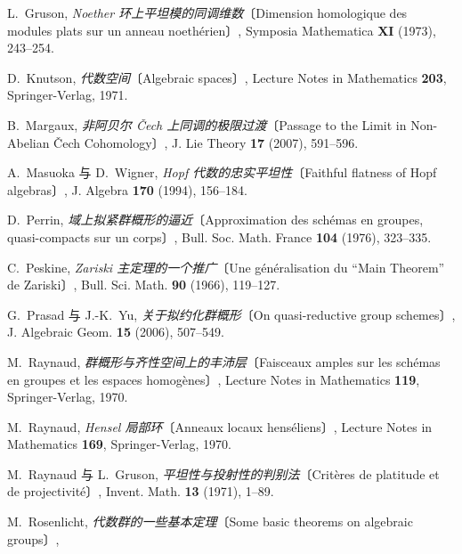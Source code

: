 \begin{description}
  L.~Gruson,
  \emph{Noether 环上平坦模的同调维数}〔Dimension homologique des modules plats sur un anneau
  noeth\'erien〕,
  Symposia Mathematica \textbf{XI} (1973), 243--254.
\item[{[Kn71]}]\label{bib:sga3-VIB-Kn71}%
  D.~Knutson,
  \emph{代数空间}〔Algebraic spaces〕,
  Lecture Notes in Mathematics \textbf{203},
  Springer-Verlag, 1971.
\item[{[Ma07]}]\label{bib:sga3-VIB-Ma07}%
  B.~Margaux,
  \emph{非阿贝尔 Čech 上同调的极限过渡}〔Passage to the Limit in Non-Abelian \v{C}ech
  Cohomology〕,
  J. Lie Theory \textbf{17} (2007), 591--596.
\item[{[MW94]}]\label{bib:sga3-VIB-MW94}%
  A.~Masuoka 与 D.~Wigner,
  \emph{Hopf 代数的忠实平坦性}〔Faithful flatness of Hopf algebras〕,
  J. Algebra \textbf{170} (1994), 156--184.
\item[{[Per76]}]\label{bib:sga3-VIB-Per76}%
  D.~Perrin,
  \emph{域上拟紧群概形的逼近}〔Approximation des sch\'emas en groupes,
  quasi-compacts sur un corps〕,
  Bull. Soc. Math. France \textbf{104} (1976), 323--335.
\item[{[Pes66]}]\label{bib:sga3-VIB-Pes66}%
  C.~Peskine,
  \emph{Zariski 主定理的一个推广}〔Une g\'en\'eralisation du ``Main Theorem'' de Zariski〕,
  Bull. Sci. Math. \textbf{90} (1966), 119--127.
\item[{[PY06]}]\label{bib:sga3-VIB-PY06}%
  G.~Prasad 与 J.-K.~Yu,
  \emph{关于拟约化群概形}〔On quasi-reductive group schemes〕,
  J. Algebraic Geom. \textbf{15} (2006), 507--549.
\item[{[Ray70a]}]\label{bib:sga3-VIB-Ray70a}%
  M.~Raynaud,
  \emph{群概形与齐性空间上的丰沛层}〔Faisceaux amples sur les sch\'emas en groupes et les
  espaces homog\`enes〕,
  Lecture Notes in Mathematics \textbf{119},
  Springer-Verlag, 1970.
\item[{[Ray70b]}]\label{bib:sga3-VIB-Ray70b}%
  M.~Raynaud,
  \emph{Hensel 局部环}〔Anneaux locaux hens\'eliens〕,
  Lecture Notes in Mathematics \textbf{169},
  Springer-Verlag, 1970.
\item[{[RG71]}]\label{bib:sga3-VIB-RG71}%
  M.~Raynaud 与 L.~Gruson,
  \emph{平坦性与投射性的判别法}〔Crit\`eres de platitude et de projectivit\'e〕,
  Invent. Math. \textbf{13} (1971), 1--89.
\item[{[Ro56]}]\label{bib:sga3-VIB-Ro56}%
  M.~Rosenlicht,
  \emph{代数群的一些基本定理}〔Some basic theorems on algebraic groups〕,

\end{description}
